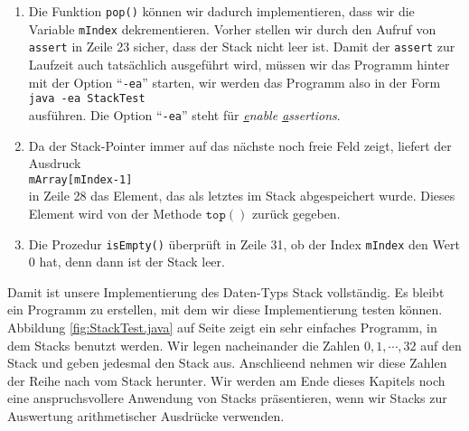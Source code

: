 \begin{enumerate}
      Anschlie\3end speichern wir das Element $e$ an der durch \texttt{mIndex}
      angegebenen Stelle ab und erh\"ohen die Variable \texttt{mIndex}, so dass diese jetzt 
      wieder auf den n\"achsten freien Index in dem Array zeigt.
\item Die Funktion \texttt{pop()} k\"onnen wir dadurch implementieren, dass wir
      die Variable \texttt{mIndex} dekrementieren.  Vorher stellen wir durch den Aufruf 
      von \texttt{assert} in Zeile 23 sicher, dass der Stack nicht leer ist.
      Damit der \texttt{assert} zur Laufzeit auch tats\"achlich ausgef\"uhrt wird,
      m\"ussen wir das Programm hinter mit der Option ``\texttt{-ea}'' starten, wir werden das
      Programm also in der Form
      \\[0.2cm]
      \hspace*{1.3cm}
      \texttt{java -ea StackTest}
      \\[0.2cm]
      ausf\"uhren.  Die Option ``\texttt{-ea}'' steht f\"ur 
      \emph{\underline{e}nable \underline{a}ssertions}.
\item Da der Stack-Pointer immer auf das n\"achste noch freie Feld zeigt,
      liefert der Ausdruck \\[0.1cm]
      \hspace*{1.3cm} \texttt{mArray[mIndex-1]} \\[0.1cm]
      in Zeile 28 das Element, das als letztes im Stack abgespeichert wurde.
      Dieses Element wird von der Methode $\mathtt{top}()$ zur\"uck gegeben.
\item Die Prozedur \texttt{isEmpty()} \"uberpr\"uft in Zeile 31, ob der Index
      \texttt{mIndex} den Wert 0 hat, denn dann ist der Stack leer.
\end{enumerate}
Damit ist unsere Implementierung des Daten-Typs Stack vollst\"andig.  Es bleibt
ein Programm zu erstellen, mit dem wir diese Implementierung testen k\"onnen.
Abbildung \ref{fig:StackTest.java} auf Seite \pageref{fig:StackTest.java}
zeigt ein sehr einfaches Programm, in dem Stacks benutzt werden.  
Wir legen nacheinander die Zahlen $0, 1, \cdots, 32$
auf den Stack und geben jedesmal den Stack aus.  Anschlie\3end nehmen wir diese Zahlen der
Reihe nach vom Stack herunter.
Wir werden am Ende dieses Kapitels noch eine anspruchsvollere Anwendung von Stacks
pr\"asentieren, wenn wir Stacks zur Auswertung arithmetischer Ausdr\"ucke verwenden.


